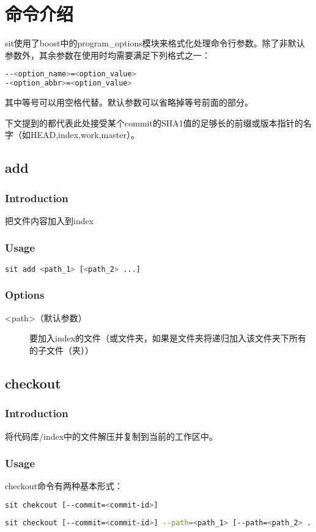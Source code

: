 \section{命令介绍}
sit使用了boost中的program\_options模块来格式化处理命令行参数。除了非默认参数外，其余参数在使用时均需要满足下列格式之一：
\begin{lstlisting}[language=sh]
--<option_name>=<option_value>
-<option_abbr>=<option_value>
\end{lstlisting}

其中等号可以用空格代替。默认参数可以省略掉等号前面的部分。

下文提到的{}都代表此处接受某个commit的SHA1值的足够长的前缀或版本指针的名字（如HEAD,index,work,master）。
\subsection{add}
\subsubsection* {Introduction}
把文件内容加入到index
\subsubsection*{Usage}
\begin{lstlisting}[language=sh]
sit add <path_1> [<path_2> ...]
\end{lstlisting}
\subsubsection*{Options}
\begin{description}
	\item[\YaHeiMono <path>（默认参数）] 要加入index的文件（或文件夹，如果是文件夹将递归加入该文件夹下所有的子文件（夹））
\end{description}

\subsection{checkout}
\subsubsection*{Introduction}
将代码库/index中的文件解压并复制到当前的工作区中。
\subsubsection*{Usage}
checkout命令有两种基本形式：
\begin{lstlisting}[language=sh]
sit chekcout [--commit=<commit-id>]
\end{lstlisting}
\begin{lstlisting}[language=sh]
sit checkout [--commit=<commit-id>] --path=<path_1> [--path=<path_2> ...]
\end{lstlisting}
